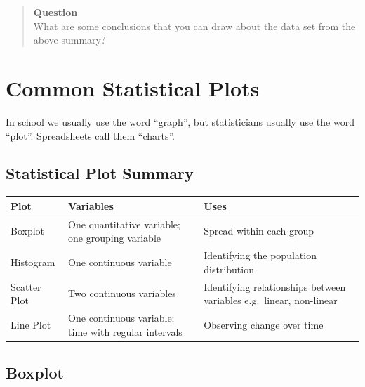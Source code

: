 \documentclass[
]{book}
\begin{document}
\begin{quote}
\textbf{Question}\\
What are some conclusions that you can draw about the data set from the above summary?
\end{quote}

\section{Common Statistical Plots}\label{common-statistical-plots}

In school we usually use the word ``graph'', but statisticians usually use the word ``plot''. Spreadsheets call them ``charts''.

\subsection{Statistical Plot Summary}\label{stat_plot_summary}

\begin{longtable}[]{@{}
  >{\raggedright\arraybackslash}p{}
  >{\raggedright\arraybackslash}p{}
  >{\raggedright\arraybackslash}p{}@{}}
\toprule\noalign{}
\begin{minipage}[b]{\linewidth}\raggedright
Plot
\end{minipage} & \begin{minipage}[b]{\linewidth}\raggedright
Variables
\end{minipage} & \begin{minipage}[b]{\linewidth}\raggedright
Uses
\end{minipage} \\
\midrule\noalign{}
\endhead
\bottomrule\noalign{}
\endlastfoot
Boxplot & One quantitative variable; one grouping variable & Spread within each group \\
Histogram & One continuous variable & Identifying the population distribution \\
Scatter Plot & Two continuous variables & Identifying relationships between variables e.g.~linear, non-linear \\
Line Plot & One continuous variable; time with regular intervals & Observing change over time \\
\end{longtable}

\subsection{Boxplot}\label{boxplot}
\end{document}
